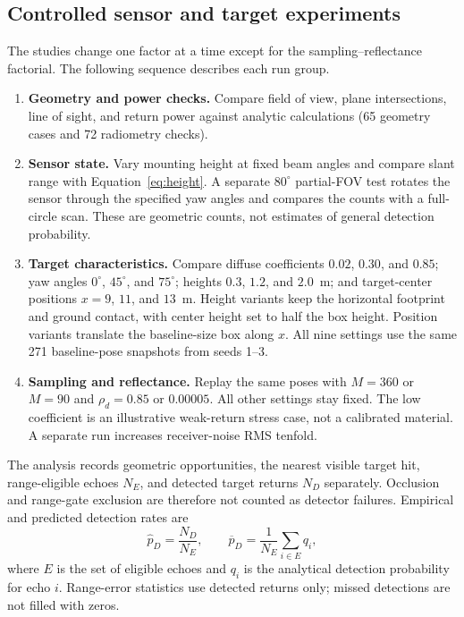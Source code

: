 \documentclass[11pt,letterpaper]{article}
\begin{document}
\subsection{Controlled sensor and target experiments}
The studies change one factor at a time except for the sampling--reflectance factorial. The following sequence describes each run group.
\begin{enumerate}\setlength{\itemsep}{1pt}\setlength{\topsep}{2pt}
  \item \textbf{Geometry and power checks.} Compare field of view, plane intersections, line of sight, and return power against analytic calculations (65 geometry cases and 72 radiometry checks).
  \item \textbf{Sensor state.} Vary mounting height at fixed beam angles and compare slant range with Equation~\eqref{eq:height}. A separate $80^\circ$ partial-FOV test rotates the sensor through the specified yaw angles and compares the counts with a full-circle scan. These are geometric counts, not estimates of general detection probability.
  \item \textbf{Target characteristics.} Compare diffuse coefficients $0.02$, $0.30$, and $0.85$; yaw angles $0^\circ$, $45^\circ$, and $75^\circ$; heights $0.3$, $1.2$, and $2.0$~m; and target-center positions $x=9$, $11$, and $13$~m. Height variants keep the horizontal footprint and ground contact, with center height set to half the box height. Position variants translate the baseline-size box along $x$. All nine settings use the same 271 baseline-pose snapshots from seeds 1--3.
  \item \textbf{Sampling and reflectance.} Replay the same poses with $M=360$ or $M=90$ and $\rho_d=0.85$ or $0.00005$. All other settings stay fixed. The low coefficient is an illustrative weak-return stress case, not a calibrated material. A separate run increases receiver-noise RMS tenfold.
\end{enumerate}

The analysis records geometric opportunities, the nearest visible target hit, range-eligible echoes $N_E$, and detected target returns $N_D$ separately. Occlusion and range-gate exclusion are therefore not counted as detector failures. Empirical and predicted detection rates are
\begin{equation}\label{eq:observed}
\widehat p_D=\frac{N_D}{N_E},\qquad \overline p_D=\frac{1}{N_E}\sum_{i\in E}q_i,
\end{equation}
where $E$ is the set of eligible echoes and $q_i$ is the analytical detection probability for echo $i$. Range-error statistics use detected returns only; missed detections are not filled with zeros.
\end{document}
